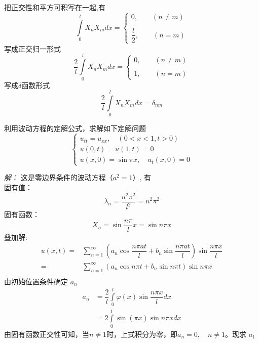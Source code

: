 ~~\\ 
把正交性和平方可积写在一起,有
\begin{equation*}
		\int\limits_{0 }^{l}  X_n X_m dx =
		\begin{cases}
		 0, \qquad (n \not= m) \\ 
		 \\ 
		 \dfrac{l}{2} , \qquad (n =m) 
		\end{cases} 
\end{equation*}
写成正交归一形式
\begin{equation*}
	\dfrac{2}{l}\int\limits_{0 }^{l}  X_n X_m dx =
	\begin{cases}
	 0, \qquad (n \not =m)  \\ 
	 \\
	1, \qquad (n=m)
	\end{cases}  
\end{equation*}
写成$\delta$函数形式
\begin{equation*}
	\dfrac{2}{l}\int\limits_{0 }^{l}  X_n X_m dx = \delta _{nm}
\end{equation*}
\begin{example}
	利用波动方程的定解公式，求解如下定解问题
$$\displaystyle  \begin{cases}
			u_{tt} =u_{xx},\quad (0<x<1, t>0)\\
			u(0,t) =u(1,t)=0 \\
			u(x,0) =\sin \pi x, \quad u_t (x,0)=0 
		\end{cases}$$  
\end{example}
\emph{解：}
这是零边界条件的波动方程（$a^2 =1$）, 有\\
固有值：$$ \lambda_n =\dfrac{n^2 \pi ^2}{l ^2 }= n^2 \pi^2 $$  
固有函数：$$  X_n = \sin \dfrac{n\pi}{l} x = \sin n \pi x $$ 
叠加解:
$$\begin{aligned}
		u(x,t) =& \sum\limits_{n=1}^{\infty }  (a_n\cos\dfrac{ n\pi at}{l}+ b_n\sin \dfrac{ n\pi at}{l}) \sin \dfrac{ n\pi x}{l}\\
		= &\sum\limits_{n=1}^{\infty }  (a_n\cos n\pi t+ b_n\sin n\pi t ) \sin n\pi x \\
	\end{aligned}$$
由初始位置条件确定 $a_n$  
	$$\begin{aligned}
			a_n&=  \dfrac{2}{l} \int\limits_{0 }^{l}  \varphi (x) \sin \dfrac{ n\pi x}{l} dx \\
			&= 2 \int\limits_{0 }^{1}  \sin(\pi x) \sin n\pi x dx    
	\end{aligned}$$ 
由固有函数正交性可知，当$n \not = 1$时，上式积分为零，即$a_n=0,\quad n \not = 1$。现求 $a_1$
